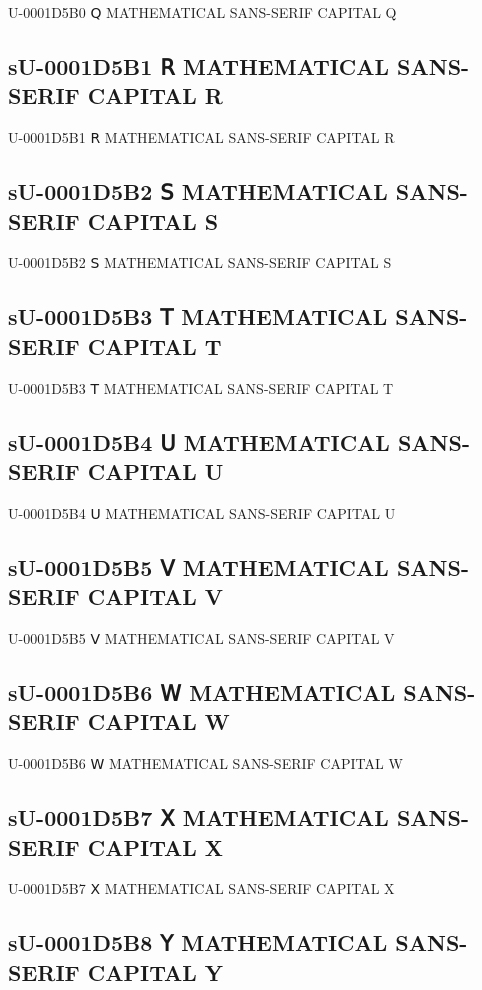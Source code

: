 U-0001D5B0 𝖰 MATHEMATICAL SANS-SERIF CAPITAL Q

\subsection{sU-0001D5B1 𝖱 MATHEMATICAL SANS-SERIF CAPITAL R}

U-0001D5B1 𝖱 MATHEMATICAL SANS-SERIF CAPITAL R

\subsection{sU-0001D5B2 𝖲 MATHEMATICAL SANS-SERIF CAPITAL S}

U-0001D5B2 𝖲 MATHEMATICAL SANS-SERIF CAPITAL S

\subsection{sU-0001D5B3 𝖳 MATHEMATICAL SANS-SERIF CAPITAL T}

U-0001D5B3 𝖳 MATHEMATICAL SANS-SERIF CAPITAL T

\subsection{sU-0001D5B4 𝖴 MATHEMATICAL SANS-SERIF CAPITAL U}

U-0001D5B4 𝖴 MATHEMATICAL SANS-SERIF CAPITAL U

\subsection{sU-0001D5B5 𝖵 MATHEMATICAL SANS-SERIF CAPITAL V}

U-0001D5B5 𝖵 MATHEMATICAL SANS-SERIF CAPITAL V

\subsection{sU-0001D5B6 𝖶 MATHEMATICAL SANS-SERIF CAPITAL W}

U-0001D5B6 𝖶 MATHEMATICAL SANS-SERIF CAPITAL W

\subsection{sU-0001D5B7 𝖷 MATHEMATICAL SANS-SERIF CAPITAL X}

U-0001D5B7 𝖷 MATHEMATICAL SANS-SERIF CAPITAL X

\subsection{sU-0001D5B8 𝖸 MATHEMATICAL SANS-SERIF CAPITAL Y}

